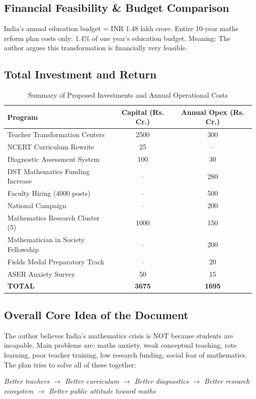 \documentclass[12pt,a4paper]{article}
\begin{document}
\subsection{Financial Feasibility \& Budget Comparison}
India’s annual education budget = INR 1.48 lakh crore. Entire 10-year maths reform plan costs only: 1.4\% of one year’s education budget. Meaning: The author argues this transformation is financially very feasible.

\subsection{Total Investment and Return}
\begin{table}[h!]
    \centering
    \caption{Summary of Proposed Investments and Annual Operational Costs}
    \vspace{0.2cm}
    \begin{tabular}{lcc}
        \toprule
        \textbf{Program} & \textbf{Capital (Rs. Cr.)} & \textbf{Annual Opex (Rs. Cr.)} \\
        \midrule
        Teacher Transformation Centers & 2500 & 300 \\
        NCERT Curriculum Rewrite & 25 & -- \\
        Diagnostic Assessment System & 100 & 30 \\
        DST Mathematics Funding Increase & -- & 280 \\
        Faculty Hiring (4000 posts) & -- & 500 \\
        National Campaign & -- & 200 \\
        Mathematics Research Cluster (5) & 1000 & 150 \\
        Mathematician in Society Fellowship & -- & 200 \\
        Fields Medal Preparatory Track & -- & 20 \\
        ASER Anxiety Survey & 50 & 15 \\
        \midrule
        \textbf{TOTAL} & \textbf{3675} & \textbf{1695} \\
        \bottomrule
    \end{tabular}
\end{table}

\subsection{Overall Core Idea of the Document}
The author believes India’s mathematics crisis is NOT because students are incapable. Main problems are: maths anxiety, weak conceptual teaching, rote learning, poor teacher training, low research funding, social fear of mathematics. The plan tries to solve all of these together:
\begin{center}
\textit{Better teachers $\rightarrow$ Better curriculum $\rightarrow$ Better diagnostics $\rightarrow$ Better research ecosystem $\rightarrow$ Better public attitude toward maths}
\end{center}
\end{document}
